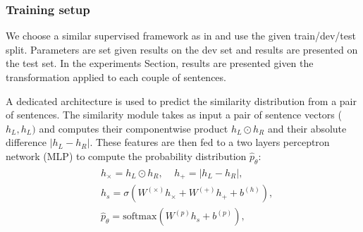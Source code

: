 \subsubsection{Training setup}
\label{sec:training-setup}
We choose a similar supervised framework as in \textcite{tai_15} and use the given train/dev/test split. Parameters are set given results on the dev set and results are presented on the test set. In the experiments Section, results are presented given the transformation applied to each couple of sentences. 





A dedicated architecture is used to predict the similarity distribution from a pair of sentences. The similarity module takes as input a pair of sentence vectors ($h_{L}, h_{L})$ and computes their component\-wise product $h_{L} \odot h_{R}$ and their absolute difference $|h_{L} - h_{R}|$. These features are then fed to a two layers perceptron network (MLP) to compute the probability distribution  $\hat{p}_{\theta}$:
\begin{align}
\begin{split}
&h_{\times}=h_L\odot h_R, ~~~~~h_{+} = |h_L - h_R |, \\
&h_s = \sigma (W^{(\times)}h_{\times} + W^{(+)}h_{+} + b^{(h)}), \\
&\hat{p}_{\theta} = \text{softmax}(W^{(p)}h_s + b^{(p)}),\\
\end{split}
\end{align}

